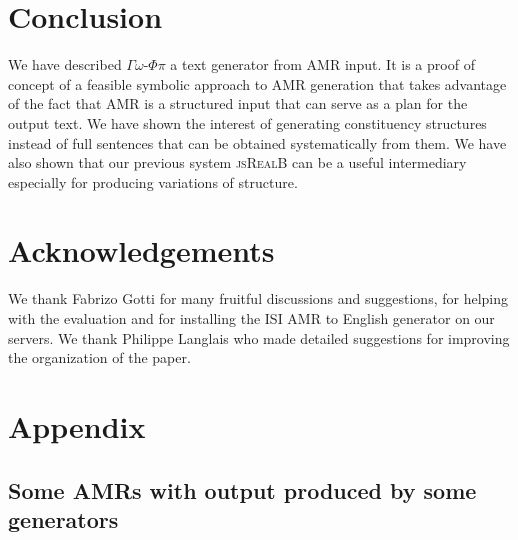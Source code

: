 \documentclass[12pt]{article}
\newcommand{\systeme}[1]{\textsc{#1}}
\newcommand{\jsr}{\systeme{jsRealB}}
\newcommand{\gophipy}{$\Gamma\omega$-$\Phi\pi$}
\newcommand{\representation}[1]{\textsf{#1}}
\newcommand{\AMR}{\representation{AMR}}
\begin{document}

\section{Conclusion} %
\label{sec:conclusion}

We have described \gophipy{} a text generator from \AMR{} input. It is a proof of concept of a feasible symbolic approach to \AMR{} generation that takes advantage of the fact that \AMR{} is a structured input that can serve as a plan for the output text. We have shown the interest of generating constituency structures instead of full sentences that can be obtained systematically from them. We have also shown that our previous system \jsr{} can be a useful intermediary especially for producing variations of structure.


\section*{Acknowledgements} %
\label{sec:acknowledgements}
We thank Fabrizo Gotti for many fruitful discussions and suggestions, for helping with the evaluation and for installing the ISI AMR to English generator on our servers. We thank Philippe Langlais who made detailed suggestions for improving the organization of the paper. 



\newpage
\section{Appendix} %
\label{sec:appendix}
\subsection{Some \AMR{}s with output produced by some generators} %
\label{sub:_amr_s_with_generated_systems}
\end{document}
